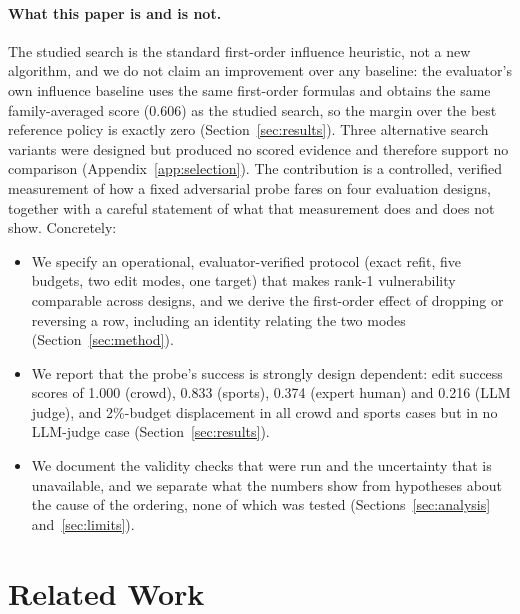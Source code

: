 \documentclass{article}
\begin{document}
\paragraph{What this paper is and is not.}
The studied search is the standard first-order influence heuristic, not a new algorithm, and we do not claim an improvement over any baseline: the evaluator's own influence baseline uses the same first-order formulas and obtains the same family-averaged score ($0.606$) as the studied search, so the margin over the best reference policy is exactly zero (Section~\ref{sec:results}).
Three alternative search variants were designed but produced no scored evidence and therefore support no comparison (Appendix~\ref{app:selection}).
The contribution is a controlled, verified measurement of how a fixed adversarial probe fares on four evaluation designs, together with a careful statement of what that measurement does and does not show.
Concretely:
\begin{itemize}
\item We specify an operational, evaluator-verified protocol (exact refit, five budgets, two edit modes, one target) that makes rank-1 vulnerability comparable across designs, and we derive the first-order effect of dropping or reversing a row, including an identity relating the two modes (Section~\ref{sec:method}).
\item We report that the probe's success is strongly design dependent: edit success scores of 1.000 (crowd), 0.833 (sports), 0.374 (expert human) and 0.216 (LLM judge), and 2\%-budget displacement in all crowd and sports cases but in no LLM-judge case (Section~\ref{sec:results}).
\item We document the validity checks that were run and the uncertainty that is unavailable, and we separate what the numbers show from hypotheses about the cause of the ordering, none of which was tested (Sections~\ref{sec:analysis} and~\ref{sec:limits}).
\end{itemize}

\section{Related Work}
\end{document}
